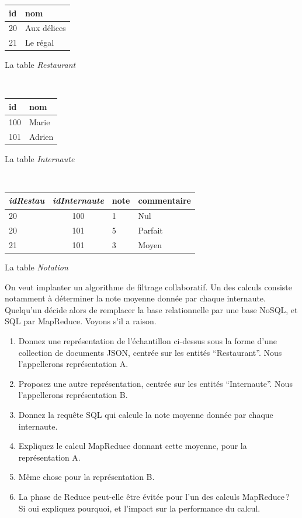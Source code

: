 \documentclass[11pt,a4paper]{article}
\newcommand{\cle}[1]{\textbf{#1}}
\def\fk#1{\textit{#1}}
\def\tble#1{\textit{#1}}
\begin{document}
\vspace*{0.2cm}
\begin{minipage}[b]{2.5cm}
\begin{tabular}{l|l}
\cle{id} & nom\\
\hline
20 & Aux délices \\
21 & Le régal \\
\hline
\end{tabular}

\centerline{La table \tble{Restaurant}}
\end{minipage} \hspace*{0.5cm} \
\begin{minipage}[b]{3cm}
\begin{tabular}{l|l}
\cle{id} &  nom  \\
\hline
100 & Marie \\
101 & Adrien \\
\hline
\end{tabular}

\centerline{La table \tble{Internaute}}
\end{minipage} \hspace*{0.3cm} \
\begin{minipage}[b]{3cm}
\begin{tabular}{l|c|l|l}
\cle{\fk{idRestau}} & \cle{\fk{idInternaute}}  & note & commentaire \\
\hline
20  & 100  & 1 & Nul\\
20 & 101  & 5 & Parfait\\
21 & 101  & 3 & Moyen\\
\hline
\end{tabular}

\centerline{La table \tble{Notation}}
\end{minipage}

\vspace*{0.2cm}
On veut implanter  un algorithme de filtrage collaboratif. Un des calculs consiste notamment
à déterminer la note moyenne donnée par chaque internaute. 
Quelqu'un décide alors de remplacer la base relationnelle par une base NoSQL, et SQL par MapReduce.
Voyons s'il a raison.

\begin{enumerate}
  \item Donnez une représentation de l'échantillon ci-dessus sous la forme d'une collection
      de documents JSON, centrée sur les entités ``Restaurant''. 
      Nous l'appellerons représentation A.
  \item Proposez une autre représentation, centrée sur les entités ``Internaute''.  Nous l'appellerons représentation B.
             \item Donnez la requête SQL qui calcule la note moyenne donnée par chaque internaute.
           \item Expliquez le calcul MapReduce donnant cette moyenne, pour la représentation A.
           \item Même chose pour la représentation B.
           \item La phase de Reduce peut-elle être évitée pour l'un des calculs MapReduce\,?
                Si oui expliquez pourquoi, et l'impact sur la performance du calcul. 
\end{enumerate}
\end{document}
